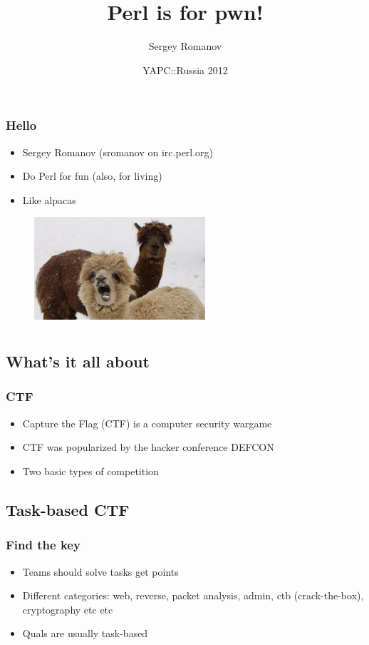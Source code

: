 \documentclass{beamer}
\title{Perl is for pwn!}
\author{Sergey Romanov}
\date{YAPC::Russia 2012}
\begin{document}
\frame{\titlepage}

\frame
{
\frametitle{Hello}
\begin{itemize}
\item Sergey Romanov (sromanov on irc.perl.org)
\item Do Perl for fun (also, for living)
\item Like alpacas
\end{itemize}
\begin{figure}
\includegraphics[width=2.5in,height=1.5in]{pics/alpacas.jpg}
\end{figure}
}

\section[CTF]{}

\subsection{What's it all about}
\frame
{
\frametitle{CTF}
\begin{itemize}
\item Capture the Flag (CTF) is a computer security wargame
\item CTF was popularized by the hacker conference DEFCON
\item Two basic types of competition
\end{itemize}
}

\subsection{Task-based CTF}
\frame
{
\frametitle{Find the key}
\begin{itemize}
\item Teams should solve tasks get points
\item Different categories: web, reverse, packet analysis, admin, ctb (crack-the-box), cryptography etc etc
\item Quals are usually task-based
\end{itemize}
}
\end{document}
